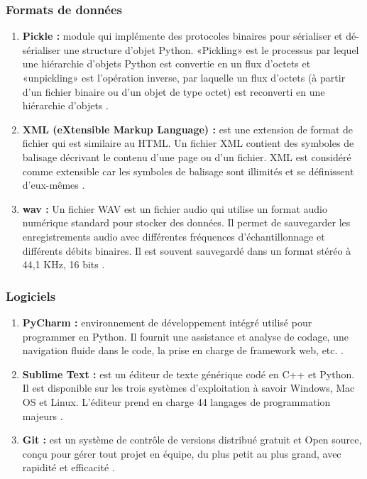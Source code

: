 \subsubsection{Formats de données}
\begin{enumerate}
    \item \textbf{Pickle :} module qui implémente des protocoles binaires pour sérialiser et dé-sérialiser une structure d'objet Python. «Pickling» est le processus par lequel une hiérarchie d'objets Python est convertie en un flux d'octets et «unpickling» est l'opération inverse, par laquelle un flux d'octets (à partir d'un fichier binaire ou d'un objet de type octet) est reconverti en une hiérarchie d'objets \cite{pickle} \label{pickle}. \\
    
    \item \textbf{XML (eXtensible Markup Language) : }  est une extension de format de fichier qui est similaire au HTML. Un fichier XML contient des symboles de balisage décrivant le contenu d'une page ou d'un fichier. XML est considéré comme extensible car les symboles de balisage sont illimités et se définissent d'eux-mêmes \cite{XML}. \\
    
    \item \textbf{wav :} Un fichier WAV est un fichier audio qui utilise un format audio numérique standard pour stocker des données. Il permet de sauvegarder les enregistrements audio avec différentes fréquences d’échantillonnage et différents débits binaires. Il est souvent sauvegardé dans un format stéréo à 44,1 KHz, 16 bits \cite{wav}.
\end{enumerate}

\subsubsection{Logiciels}
\begin{enumerate}
    \item \textbf{PyCharm :} environnement de développement intégré utilisé pour programmer en Python. Il fournit une assistance et analyse de codage, une navigation fluide dans le code, la prise en charge de framework web, etc. \cite{pycharm}. \\
    
    \item \textbf{Sublime Text :} est un éditeur de texte générique codé en C++ et Python. Il est disponible sur les trois systèmes d'exploitation à savoir Windows, Mac OS et Linux. L'éditeur prend en charge 44 langages de programmation majeurs \cite{sublime}. \\
    
    \item \textbf{Git :} est un système de contrôle de versions distribué gratuit et Open source, conçu pour gérer tout projet en équipe, du plus petit au plus grand, avec rapidité et efficacité \cite{git}.
\end{enumerate}


